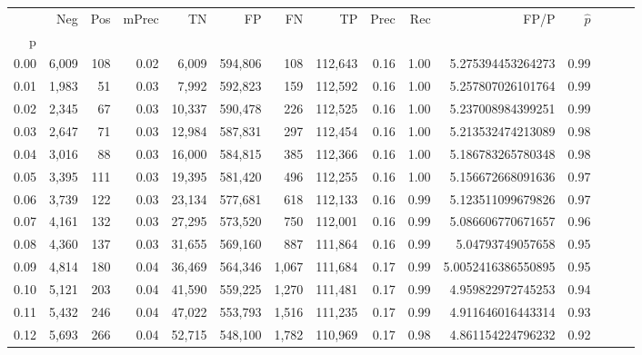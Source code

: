 \begin{tabular}{rrrrrrrrrrrrrrr}
\toprule
{} &     Neg &    Pos & mPrec &       TN &       FP &       FN &       TP &  Prec &   Rec &                  FP/P & $\hat{p}$ \\
p    &         &        &       &          &          &          &          &       &       &                       &           \\
\midrule
0.00 &   6,009 &    108 &  0.02 &    6,009 &  594,806 &      108 &  112,643 &  0.16 &  1.00 &     5.275394453264273 &      0.99 \\
0.01 &   1,983 &     51 &  0.03 &    7,992 &  592,823 &      159 &  112,592 &  0.16 &  1.00 &     5.257807026101764 &      0.99 \\
0.02 &   2,345 &     67 &  0.03 &   10,337 &  590,478 &      226 &  112,525 &  0.16 &  1.00 &     5.237008984399251 &      0.99 \\
0.03 &   2,647 &     71 &  0.03 &   12,984 &  587,831 &      297 &  112,454 &  0.16 &  1.00 &     5.213532474213089 &      0.98 \\
0.04 &   3,016 &     88 &  0.03 &   16,000 &  584,815 &      385 &  112,366 &  0.16 &  1.00 &     5.186783265780348 &      0.98 \\
0.05 &   3,395 &    111 &  0.03 &   19,395 &  581,420 &      496 &  112,255 &  0.16 &  1.00 &     5.156672668091636 &      0.97 \\
0.06 &   3,739 &    122 &  0.03 &   23,134 &  577,681 &      618 &  112,133 &  0.16 &  0.99 &     5.123511099679826 &      0.97 \\
0.07 &   4,161 &    132 &  0.03 &   27,295 &  573,520 &      750 &  112,001 &  0.16 &  0.99 &     5.086606770671657 &      0.96 \\
0.08 &   4,360 &    137 &  0.03 &   31,655 &  569,160 &      887 &  111,864 &  0.16 &  0.99 &      5.04793749057658 &      0.95 \\
0.09 &   4,814 &    180 &  0.04 &   36,469 &  564,346 &    1,067 &  111,684 &  0.17 &  0.99 &    5.0052416386550895 &      0.95 \\
0.10 &   5,121 &    203 &  0.04 &   41,590 &  559,225 &    1,270 &  111,481 &  0.17 &  0.99 &     4.959822972745253 &      0.94 \\
0.11 &   5,432 &    246 &  0.04 &   47,022 &  553,793 &    1,516 &  111,235 &  0.17 &  0.99 &     4.911646016443314 &      0.93 \\
0.12 &   5,693 &    266 &  0.04 &   52,715 &  548,100 &    1,782 &  110,969 &  0.17 &  0.98 &     4.861154224796232 &      0.92 \\

\end{tabular}
